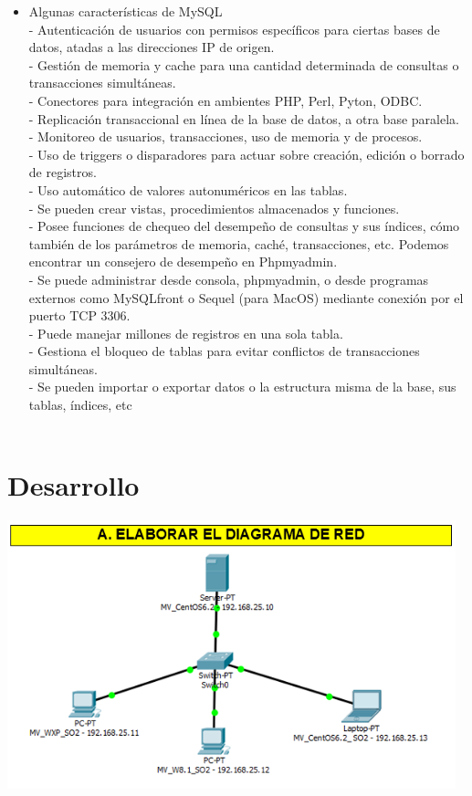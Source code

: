\begin{itemize}
\item Algunas características de MySQL
\\- Autenticación de usuarios con permisos específicos para ciertas bases de datos, atadas a las direcciones IP de origen.
\\-	Gestión de memoria y cache para una cantidad determinada de consultas o transacciones simultáneas.
\\-	Conectores para integración en ambientes PHP, Perl, Pyton, ODBC.
\\-	Replicación transaccional en línea de la base de datos, a otra base paralela.
\\- Monitoreo de usuarios, transacciones, uso de memoria  y de procesos.
\\- Uso de triggers o disparadores para actuar sobre creación, edición o borrado de registros.
\\- Uso automático de valores autonuméricos en las tablas.
\\- Se pueden crear vistas, procedimientos almacenados y funciones.
\\- Posee funciones de chequeo del desempeño de consultas y sus índices, cómo también de los parámetros de memoria, caché, transacciones, etc. Podemos encontrar un consejero de desempeño en Phpmyadmin.
\\- Se puede administrar desde consola, phpmyadmin, o desde programas externos como MySQLfront o Sequel (para MacOS) mediante conexión por el puerto TCP 3306.
\\- Puede manejar millones de registros en una sola tabla.
\\- Gestiona el bloqueo de tablas para evitar conflictos de transacciones simultáneas.
\\- Se pueden importar o exportar datos o la estructura misma de la base, sus tablas, índices, etc
\\\
\end{itemize}

\section{Desarrollo} 
\begin{itemize}
	\begin{center}
		\includegraphics[width=13cm]{./Imagenes/2a}
		\end{center}
\end{itemize} 

